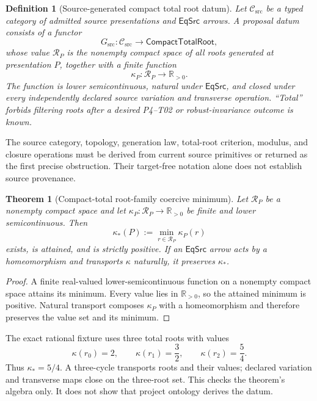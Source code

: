 \documentclass[11pt]{article}
\newtheorem{definition}{Definition}
\newtheorem{theorem}{Theorem}
\newcommand{\R}{\mathbb R}
\newcommand{\EqSrc}{\mathsf{EqSrc}}
\begin{document}
\begin{definition}[Source-generated compact total root datum]
Let \(\mathcal C_{\mathrm{src}}\) be a typed category of admitted source
presentations and \(\EqSrc\) arrows.  A proposal datum consists of a functor
\[
  G_{\mathrm{src}}:\mathcal C_{\mathrm{src}}
     \longrightarrow \mathsf{CompactTotalRoot},
\]
whose value \(\mathcal R_P\) is the nonempty compact space of \emph{all}
roots generated at presentation \(P\), together with a finite function
\[
  \kappa_P:\mathcal R_P\longrightarrow \R_{>0}.
\]
The function is lower semicontinuous, natural under \(\EqSrc\), and closed
under every independently declared source variation and transverse
operation.  ``Total'' forbids filtering roots after a desired P4--T02 or
robust-invariance outcome is known.
\end{definition}

The source category, topology, generation law, total-root criterion, modulus,
and closure operations must be derived from current source primitives or
returned as the first precise obstruction.  Their target-free notation alone
does not establish source provenance.

\begin{theorem}[Compact-total root-family coercive minimum]
\label{thm:minimum}
Let \(\mathcal R_P\) be a nonempty compact space and let
\(\kappa_P:\mathcal R_P\to\R_{>0}\) be finite and lower semicontinuous.  Then
\[
  \kappa_*(P):=\min_{r\in\mathcal R_P}\kappa_P(r)
\]
exists, is attained, and is strictly positive.  If an \(\EqSrc\) arrow acts
by a homeomorphism and transports \(\kappa\) naturally, it preserves
\(\kappa_*\).
\end{theorem}

\begin{proof}
A finite real-valued lower-semicontinuous function on a nonempty compact
space attains its minimum.  Every value lies in \(\R_{>0}\), so the attained
minimum is positive.  Natural transport composes \(\kappa_P\) with a
homeomorphism and therefore preserves the value set and its minimum.
\end{proof}

The exact rational fixture uses three total roots with values
\[
  \kappa(r_0)=2,\qquad \kappa(r_1)=\frac32,
  \qquad \kappa(r_2)=\frac54.
\]
Thus \(\kappa_*=5/4\).  A three-cycle transports roots and their values;
declared variation and transverse maps close on the three-root set.  This
checks the theorem's algebra only.  It does not show that project ontology
derives the datum.
\end{document}
